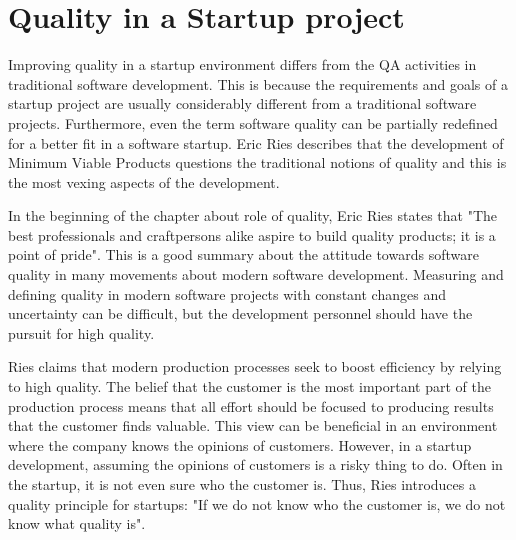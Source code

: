 


 \section{Quality in a Startup project}
\label{sec:quality_startup}

Improving quality in a startup environment differs from the QA activities in traditional software development. This is because the requirements and goals of a startup project are usually considerably different from a traditional software projects. Furthermore, even the term software quality can be partially redefined for a better fit in a software startup. Eric Ries describes that the development of Minimum Viable Products questions the traditional notions of quality and this is the most vexing aspects of the development.~\cite{ries2011lean}

In the beginning of the chapter about role of quality, Eric Ries states that "The best professionals and craftpersons alike aspire to build quality products; it is a point of pride". This is a good summary about the attitude towards software quality in many movements about modern software development. Measuring and defining quality in modern software projects with constant changes and uncertainty can be difficult, but the development personnel should have the pursuit for high quality.~\cite{ries2011lean}

Ries claims that modern production processes seek to boost efficiency by relying to high quality. The belief that the customer is the most important part of the production process means that all effort should be focused to producing results that the customer finds valuable. This view can be beneficial in an environment where the company knows the opinions of customers. However, in a startup development, assuming the opinions of customers is a risky thing to do. Often in the startup, it is not even sure who the customer is. Thus, Ries introduces a quality principle for startups: "If we do not know who the customer is, we do not know what quality is".~\cite{ries2011lean}

